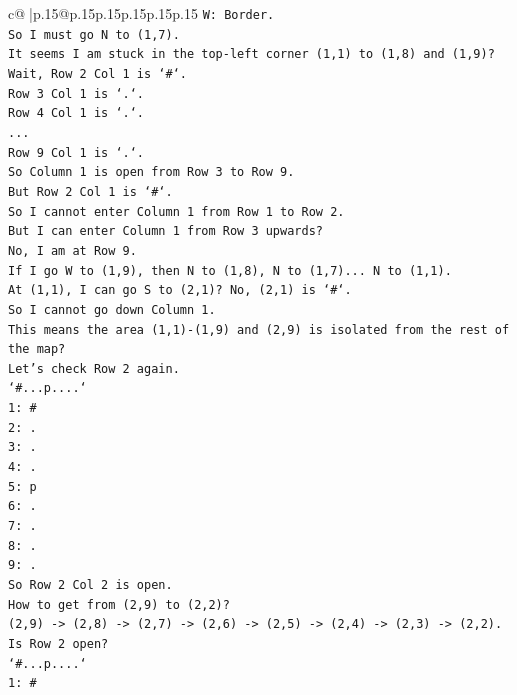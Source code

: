 \documentclass{article}
\begin{document}
{\begin{supertabular}{c@{$\;$}|p{.15\linewidth}@{}p{.15\linewidth}p{.15\linewidth}p{.15\linewidth}p{.15\linewidth}p{.15\linewidth}}
{{{\texttt{W: Border.} \\
\texttt{So I must go N to (1,7).} \\
\texttt{It seems I am stuck in the top{-}left corner (1,1) to (1,8) and (1,9)?} \\
\texttt{Wait, Row 2 Col 1 is `\#`.} \\
\texttt{Row 3 Col 1 is `.`.} \\
\texttt{Row 4 Col 1 is `.`.} \\
\texttt{...} \\
\texttt{Row 9 Col 1 is `.`.} \\
\texttt{So Column 1 is open from Row 3 to Row 9.} \\
\texttt{But Row 2 Col 1 is `\#`.} \\
\texttt{So I cannot enter Column 1 from Row 1 to Row 2.} \\
\texttt{But I can enter Column 1 from Row 3 upwards?} \\
\texttt{No, I am at Row 9.} \\
\texttt{If I go W to (1,9), then N to (1,8), N to (1,7)... N to (1,1).} \\
\texttt{At (1,1), I can go S to (2,1)? No, (2,1) is `\#`.} \\
\texttt{So I cannot go down Column 1.} \\
\texttt{This means the area (1,1){-}(1,9) and (2,9) is isolated from the rest of the map?} \\
\texttt{Let's check Row 2 again.} \\
\texttt{`\#...p....`} \\
\texttt{1: \#} \\
\texttt{2: .} \\
\texttt{3: .} \\
\texttt{4: .} \\
\texttt{5: p} \\
\texttt{6: .} \\
\texttt{7: .} \\
\texttt{8: .} \\
\texttt{9: .} \\
\texttt{So Row 2 Col 2 is open.} \\
\texttt{How to get from (2,9) to (2,2)?} \\
\texttt{(2,9) {-}> (2,8) {-}> (2,7) {-}> (2,6) {-}> (2,5) {-}> (2,4) {-}> (2,3) {-}> (2,2).} \\
\texttt{Is Row 2 open?} \\
\texttt{`\#...p....`} \\
\texttt{1: \#} \\
}}}
\end{supertabular}}
\end{document}
